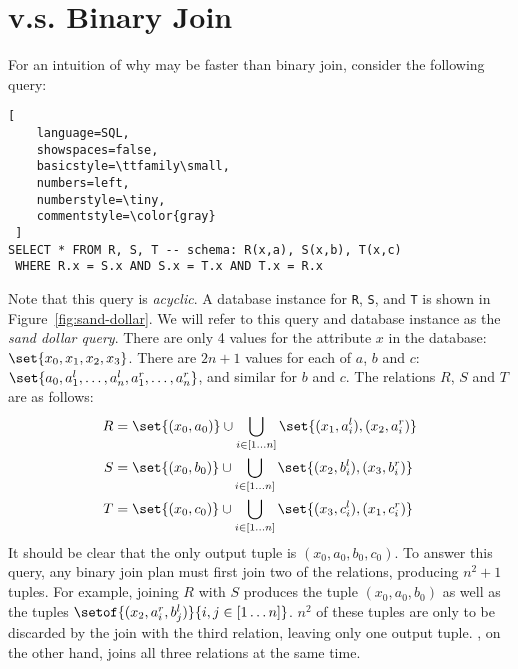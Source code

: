 \section{\GJ v.s. Binary Join}

For an intuition of why \GJ may be faster than binary join, 
  consider the following query:
  \begin{lstlisting}[
    language=SQL,
    showspaces=false,
    basicstyle=\ttfamily\small,
    numbers=left,
    numberstyle=\tiny,
    commentstyle=\color{gray}
 ]
SELECT * FROM R, S, T -- schema: R(x,a), S(x,b), T(x,c)
 WHERE R.x = S.x AND S.x = T.x AND T.x = R.x
\end{lstlisting}
Note that this query is \emph{acyclic}.
A database instance for \texttt{R}, \texttt{S}, and \texttt{T} 
  is shown in Figure~\ref{fig:sand-dollar}.
We will refer to this query and database instance as the \emph{sand dollar query}.
There are only 4 values for the attribute $x$ in the database:
  $\set{x_0, x_1, x_2, x_3}$.
There are $2n+1$ values for each of $a$, $b$ and $c$:
  $\set{a_0, a_1^l, \ldots, a_n^l, a_1^r, \ldots, a_n^r}$, 
  and similar for $b$ and $c$. 
The relations $R$, $S$ and $T$ are as follows:
%
\begin{align*}
  R & = \set{(x_0, a_0)} \cup \bigcup_{i \in [1 \ldots n]} \set{(x_1, a_i^l), (x_2, a_i^r)} \\
  S & = \set{(x_0, b_0)} \cup \bigcup_{i \in [1 \ldots n]} \set{(x_2, b_i^l), (x_3, b_i^r)} \\
  T & = \set{(x_0, c_0)} \cup \bigcup_{i \in [1 \ldots n]} \set{(x_3, c_i^l), (x_1, c_i^r)} 
\end{align*}
%
It should be clear that the only output tuple is $(x_0, a_0, b_0, c_0)$.
To answer this query,
  any binary join plan must first join two of the relations,
  producing $n^2 + 1$ tuples.
For example, joining $R$ with $S$ produces the tuple $(x_0, a_0, b_0)$
  as well as the tuples $\setof{(x_2, a_i^r, b_j^l)}{i, j \in [1 \ldots n]}$.
$n^2$ of these tuples are only to be discarded by the join 
  with the third relation, leaving only one output tuple.
\GJ, on the other hand, joins all three relations at the same time.
